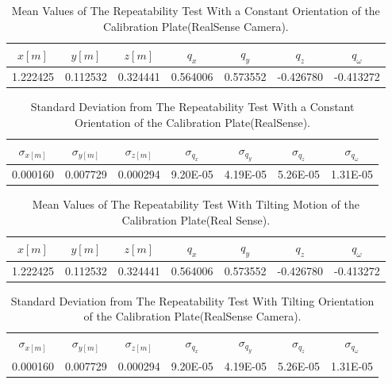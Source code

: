 \begin{table}[ht]
\renewcommand{\arraystretch}{1.3}
\caption{Mean Values of The Repeatability Test With a Constant Orientation of the Calibration Plate(RealSense Camera).}
\label{meanreal1}
\centering
\begin{tabular}{|c||c||c||c||c||c||c|}
\hline
$x[m]$ & $y[m]$ & $z[m]$ & $q_{x}$ & $q_{y}$ & $q_{z}$ &$q_{\omega}$ \\
\hline
1.222425&	0.112532&	0.324441&0.564006&	0.573552&	-0.426780&	-0.413272 \\
\hline
\hline
\end{tabular}
\end{table}
\begin{table}[ht]
\renewcommand{\arraystretch}{1.3}
\caption{Standard Deviation from The Repeatability Test With a Constant Orientation of the Calibration Plate(RealSense).}
\label{standardreal1}
\centering
\begin{tabular}{|c||c||c||c||c||c||c|}
\hline
$\sigma_{x[m]}$ & $\sigma_{y[m]}$ & $\sigma_{z[m]}$ & $\sigma_{q_{x}}$ & $\sigma_{q_{y}}$ & $\sigma_{q_{z}}$ &$\sigma_{q_{\omega}}$ \\
\hline
0.000160&	0.007729&	0.000294&9.20E-05&	4.19E-05&	5.26E-05&	1.31E-05\\
\hline
\hline
\end{tabular}
\end{table}
\begin{table}[ht]
\renewcommand{\arraystretch}{1.3}
\caption{Mean Values of The Repeatability Test With Tilting Motion of the Calibration Plate(Real Sense).}
\label{meanreal2}
\centering
\begin{tabular}{|c||c||c||c||c||c||c|}
\hline
$x[m]$ & $y[m]$ & $z[m]$ & $q_{x}$ & $q_{y}$ & $q_{z}$ &$q_{\omega}$ \\
\hline
1.222425&	0.112532&	0.324441&0.564006&	0.573552&	-0.426780&	-0.413272  \\
\hline
\hline
\end{tabular}
\end{table}
\begin{table}[ht]
\renewcommand{\arraystretch}{1.3}
\caption{Standard Deviation from The Repeatability Test With Tilting Orientation of the Calibration Plate(RealSense Camera).}
\label{standardreal2}
\centering
\begin{tabular}{|c||c||c||c||c||c||c|}
\hline
$\sigma_{x[m]}$ & $\sigma_{y[m]}$ & $\sigma_{z[m]}$ & $\sigma_{q_{x}}$ & $\sigma_{q_{y}}$ & $\sigma_{q_{z}}$ &$\sigma_{q_{\omega}}$ \\
0.000160&	0.007729&	0.000294&9.20E-05&	4.19E-05&	5.26E-05&	1.31E-05\\
\hline
\hline
\end{tabular}
\end{table}

